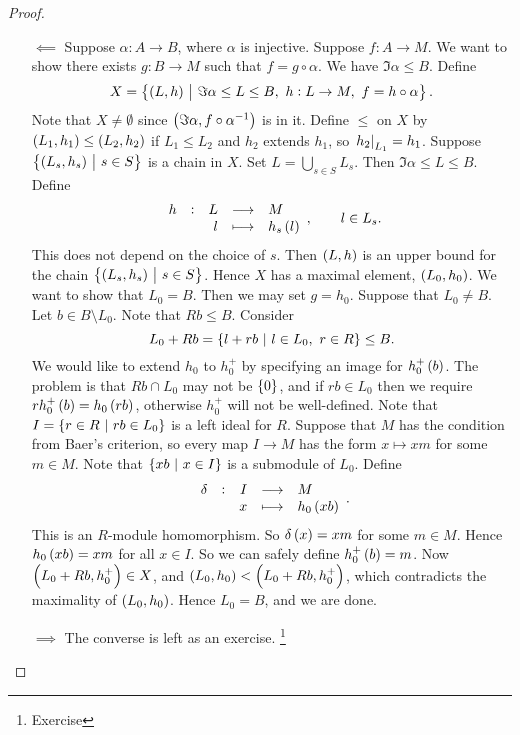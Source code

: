 \begin{proof}
\hfill
\begin{itemize}
\item[$ \impliedby $] Suppose $ \alpha : A \to B $, where $ \alpha $ is injective. Suppose $ f : A \to M $. We want to show there exists $ g : B \to M $ such that $ f = g \circ \alpha $. We have $ \Im \alpha \le B $. Define
$$ X = \cbr{\br{L, h} \st \Im \alpha \le L \le B, \ h : L \to M, \ f = h \circ \alpha}. $$
Note that $ X \ne \emptyset $ since $ \br{\Im \alpha, f \circ \alpha^{-1}} $ is in it. Define $ \le $ on $ X $ by $ \br{L_1, h_1} \le \br{L_2, h_2} $ if $ L_1 \le L_2 $ and $ h_2 $ extends $ h_1 $, so $ \left. h_2 \right|_{L_1} = h_1 $. Suppose $ \cbr{\br{L_s, h_s} \st s \in S} $ is a chain in $ X $. Set $ L = \bigcup_{s \in S} L_s $. Then $ \Im \alpha \le L \le B $. Define
$$ \function[h]{L}{M}{l}{h_s\br{l}}, \qquad l \in L_s. $$
This does not depend on the choice of $ s $. Then $ \br{L, h} $ is an upper bound for the chain $ \cbr{\br{L_s, h_s} \st s \in S} $. Hence $ X $ has a maximal element, $ \br{L_0, h_0} $. We want to show that $ L_0 = B $. Then we may set $ g = h_0 $. Suppose that $ L_0 \ne B $. Let $ b \in B \setminus L_0 $. Note that $ Rb \le B $. Consider
$$ L_0 + Rb = \cbr{l + rb \st l \in L_0, \ r \in R} \le B. $$
We would like to extend $ h_0 $ to $ h_0^+ $ by specifying an image for $ h_0^+\br{b} $. The problem is that $ Rb \cap L_0 $ may not be $ \cbr{0} $, and if $ rb \in L_0 $ then we require $ rh_0^+\br{b} = h_0\br{rb} $, otherwise $ h_0^+ $ will not be well-defined. Note that $ I = \cbr{r \in R \st rb \in L_0} $ is a left ideal for $ R $. Suppose that $ M $ has the condition from Baer's criterion, so every map $ I \to M $ has the form $ x \mapsto xm $ for some $ m \in M $. Note that $ \cbr{xb \st x \in I} $ is a submodule of $ L_0 $. Define
$$ \function[\delta]{I}{M}{x}{h_0\br{xb}}. $$
This is an $ R $-module homomorphism. So $ \delta\br{x} = xm $ for some $ m \in M $. Hence $ h_0\br{xb} = xm $ for all $ x \in I $. So we can safely define $ h_0^+\br{b} = m $. Now $ \br{L_0 + Rb, h_0^+} \in X $, and $ \br{L_0, h_0} < \br{L_0 + Rb, h_0^+} $, which contradicts the maximality of $ \br{L_0, h_0} $. Hence $ L_0 = B $, and we are done.
\item[$ \implies $] The converse is left as an exercise. \footnote{Exercise}
\end{itemize}
\end{proof}

